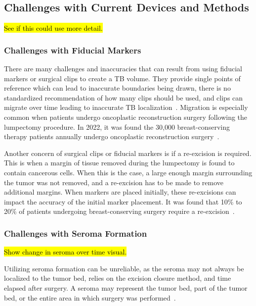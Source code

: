 \subsection{Challenges with Current Devices and Methods\label{sec:introduction:motivation:challengeswithcurrentdevicesandmethods}}
\hl{See if this could use more detail.}
\subsubsection{Challenges with Fiducial Markers\label{sec:introduction:motivation:challengeswithcurrentdevicesandmethods:challengeswithfiducialmarkers}}
There are many challenges and inaccuracies that can result from using fiducial markers or surgical clips to create a TB volume. They provide single points of reference which can lead to inaccurate boundaries being drawn, there is no standardized recommendation of how many clips should be used, and clips can migrate over time leading to inaccurate TB localization~\cite{RefWorks:RefID:344-mitchell2019adaptable}. Migration is especially common when patients undergo oncoplastic reconstruction surgery following the lumpectomy procedure. In 2022, it was found the 30,000 breast-conserving therapy patients annually undergo oncoplastic reconstruction surgery~\cite{RefWorks:RefID:25-acree2022review}.

Another concern of surgical clips or fiducial markers is if a re-excision is required. This is when a margin of tissue removed during the lumpectomy is found to contain cancerous cells. When this is the case, a large enough margin surrounding the tumor was not removed, and a re-excision has to be made to remove additional margins. When markers are placed initially, these re-excisions can impact the accuracy of the initial marker placement. It was found that 10\% to 20\% of patients undergoing breast-conserving surgery require a re-excision~\cite{RefWorks:RefID:25-acree2022review}.

\subsubsection{Challenges with Seroma Formation\label{sec:introduction:motivation:challengeswithcurrentdevicesandmethods:challengeswithseromaformation}}
\hl{Show change in seroma over time visual.\\}

Utilizing seroma formation can be unreliable, as the seroma may not always be localized to the tumor bed, relies on the excision closure method, and time elapsed after surgery\cite{RefWorks:RefID:25-acree2022review}. A seroma may represent the tumor bed, part of the tumor bed, or the entire area in which surgery was performed~\cite{RefWorks:RefID:344-mitchell2019adaptable}.

